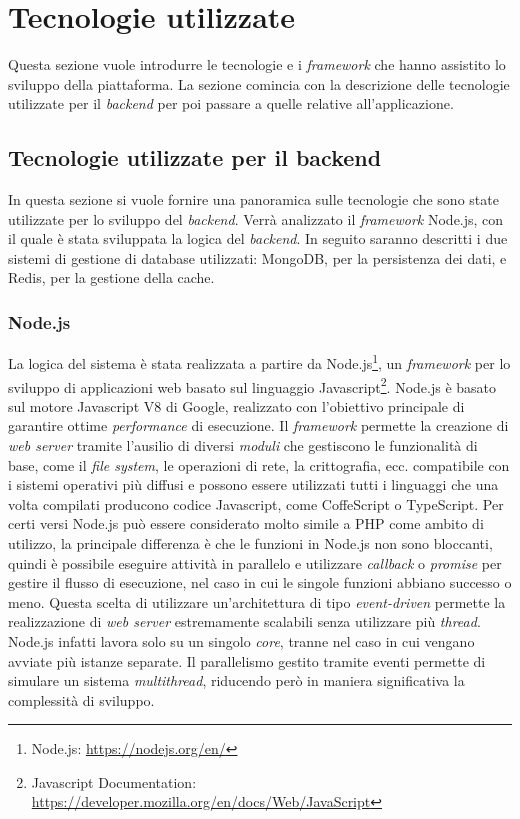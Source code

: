 \section{Tecnologie utilizzate}

Questa sezione vuole introdurre le tecnologie e i \emph{framework} che hanno assistito lo sviluppo della piattaforma. La sezione comincia con la descrizione delle tecnologie utilizzate per il \emph{backend} per poi passare a quelle relative all'applicazione.

\subsection{Tecnologie utilizzate per il backend\label{sec:tecnologie-backend-background}}

In questa sezione si vuole fornire una panoramica sulle tecnologie che sono state utilizzate per lo sviluppo del \emph{backend}. Verrà analizzato il \emph{framework} Node.js, con il quale è stata sviluppata la logica del \emph{backend}. In seguito saranno descritti i due sistemi di gestione di database utilizzati: MongoDB, per la persistenza dei dati, e Redis, per la gestione della cache.

\subsubsection{Node.js}

La logica del sistema è stata realizzata a partire da Node.js\footnote{Node.js: \url{https://nodejs.org/en/}}, un \emph{framework} per lo sviluppo di applicazioni web basato sul linguaggio Javascript\footnote{Javascript Documentation: \url{https://developer.mozilla.org/en/docs/Web/JavaScript}}. Node.js è basato sul motore Javascript V8 di Google, realizzato con l'obiettivo principale di garantire ottime \emph{performance} di esecuzione. Il \emph{framework} permette la creazione di \emph{web server} tramite l'ausilio di diversi \emph{moduli} che gestiscono le funzionalità di base, come il \emph{file system}, le operazioni di rete, la crittografia, ecc. \upe compatibile con i sistemi operativi più diffusi e possono essere utilizzati tutti i linguaggi che una volta compilati producono codice Javascript, come CoffeScript o TypeScript. Per certi versi Node.js può essere considerato molto simile a PHP come ambito di utilizzo, la principale differenza è che le funzioni in Node.js non sono bloccanti, quindi è possibile eseguire attività in parallelo e utilizzare \emph{callback} o \emph{promise} per gestire il flusso di esecuzione, nel caso in cui le singole funzioni abbiano successo o meno. Questa scelta di utilizzare un'architettura di tipo \emph{event-driven} permette la realizzazione di \emph{web server} estremamente scalabili senza utilizzare più \emph{thread}. Node.js infatti lavora solo su un singolo \emph{core}, tranne nel caso in cui vengano avviate più istanze separate. Il parallelismo gestito tramite eventi permette di simulare un sistema \emph{multithread}, riducendo però in maniera significativa la complessità di sviluppo.

